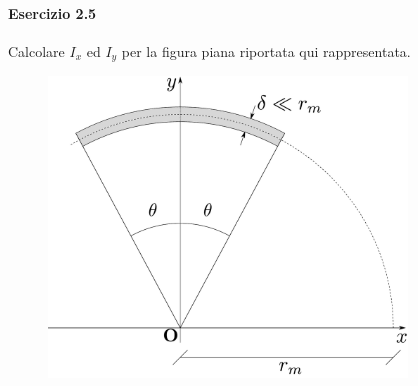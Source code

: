 \paragraph{Esercizio 2.5} Calcolare $I_x$ ed $I_y$ per la figura piana riportata qui rappresentata.
\renewcommand{\thefigure}{2.5~-~1}
\begin{figure}[h]
\centering
\includegraphics[width=0.85\textwidth]{Immagini/Parte_2/Esercizio2_5/Esercizio2_5_1.pdf}
\caption{}
\label{Esercizio2_5}
\end{figure}
\newline

